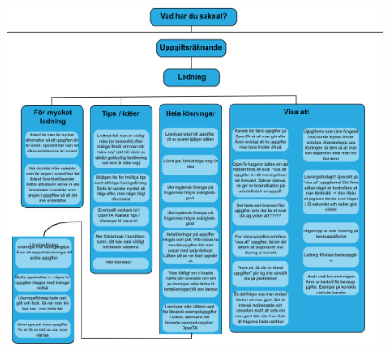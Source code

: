 \begin{figure}[hbtp]
    \centering
    \includegraphics[scale=0.454,angle=90]{appendix/appendix_blue/nr8_part2_new.png}
    \caption*{}
    \label{fig:nr8_part2}
\end{figure}

